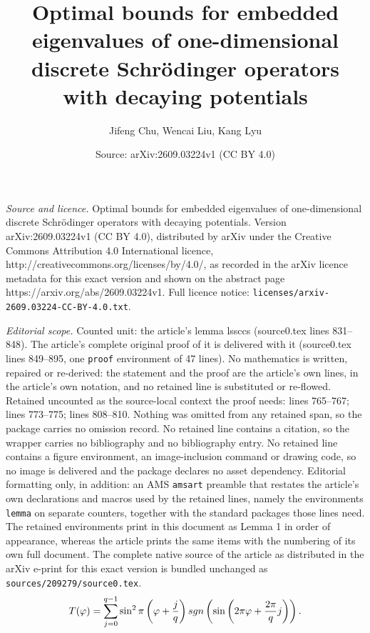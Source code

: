 \documentclass[10pt,a4paper]{amsart}
\title{Optimal bounds for embedded eigenvalues of one-dimensional discrete Schr\"odinger operators with decaying potentials}
\author{Jifeng Chu, Wencai Liu, Kang Lyu}
\date{Source: arXiv:2609.03224v1 (CC BY 4.0)}
\begin{document}
\maketitle

\noindent\emph{Source and licence.} Optimal bounds for embedded eigenvalues of one-dimensional discrete Schr\"odinger operators with decaying potentials. Version arXiv:2609.03224v1 (CC BY 4.0), distributed by arXiv under the Creative Commons Attribution 4.0 International licence, http://creativecommons.org/licenses/by/4.0/, as recorded in the arXiv licence metadata for this exact version and shown on the abstract page https://arxiv.org/abs/2609.03224v1. Full licence notice: \texttt{licenses/arxiv-2609.03224-CC-BY-4.0.txt}.\par\smallskip

\noindent\textit{Editorial scope.} Counted unit: the article's lemma lssccs (source0.tex lines 831--848). The article's complete original proof of it is delivered with it (source0.tex lines 849--895, one \texttt{proof} environment of 47 lines). No mathematics is written, repaired or re-derived: the statement and the proof are the article's own lines, in the article's own notation, and no retained line is substituted or re-flowed.  Retained uncounted as the source-local context the proof needs: lines 765--767; lines 773--775; lines 808--810.  Nothing was omitted from any retained span, so the package carries no omission record.  No retained line contains a citation, so the wrapper carries no bibliography and no bibliography entry.  No retained line contains a figure environment, an image-inclusion command or drawing code, so no image is delivered and the package declares no asset dependency.  Editorial formatting only, in addition: an AMS \texttt{amsart} preamble that restates the article's own declarations and macros used by the retained lines, namely the environments \texttt{lemma} on separate counters, together with the standard packages those lines need.  The retained environments print in this document as Lemma 1 in order of appearance, whereas the article prints the same items with the numbering of its own full document.  The complete native source of the article as distributed in the arXiv e-print for this exact version is bundled unchanged as \texttt{sources/209279/source0.tex}.
\begin{align}
	T(\varphi)=\sum_{j=0}^{q-1}\sin^2\pi\left(\varphi+\frac{j}{q}\right){\rm{sgn}}\left(\sin\left(2\pi\varphi+\frac{2\pi}{q}j\right)\right).\label{definitionofT_qtheta}
\end{align}
\end{document}
